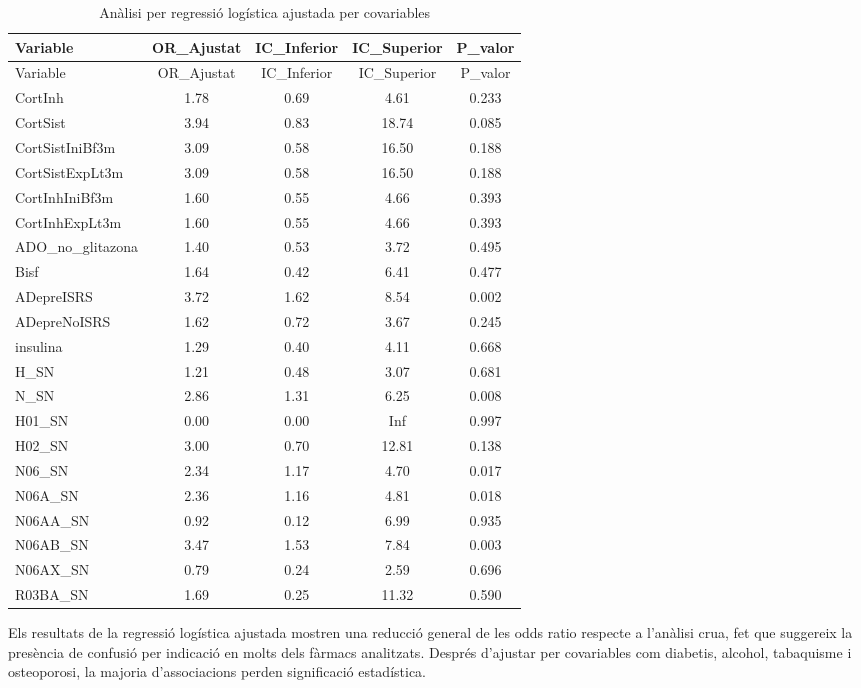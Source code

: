 \documentclass[
]{article}
\begin{document}
\begin{longtable}[]{@{}lcccc@{}}
\caption{\label{tab:logajust}Anàlisi per regressió logística ajustada
per covariables}\tabularnewline
\toprule\noalign{}
Variable & OR\_Ajustat & IC\_Inferior & IC\_Superior & P\_valor \\
\midrule\noalign{}
\endfirsthead
\toprule\noalign{}
Variable & OR\_Ajustat & IC\_Inferior & IC\_Superior & P\_valor \\
\midrule\noalign{}
\endhead
\bottomrule\noalign{}
\endlastfoot
CortInh & 1.78 & 0.69 & 4.61 & 0.233 \\
CortSist & 3.94 & 0.83 & 18.74 & 0.085 \\
CortSistIniBf3m & 3.09 & 0.58 & 16.50 & 0.188 \\
CortSistExpLt3m & 3.09 & 0.58 & 16.50 & 0.188 \\
CortInhIniBf3m & 1.60 & 0.55 & 4.66 & 0.393 \\
CortInhExpLt3m & 1.60 & 0.55 & 4.66 & 0.393 \\
ADO\_no\_glitazona & 1.40 & 0.53 & 3.72 & 0.495 \\
Bisf & 1.64 & 0.42 & 6.41 & 0.477 \\
ADepreISRS & 3.72 & 1.62 & 8.54 & 0.002 \\
ADepreNoISRS & 1.62 & 0.72 & 3.67 & 0.245 \\
insulina & 1.29 & 0.40 & 4.11 & 0.668 \\
H\_SN & 1.21 & 0.48 & 3.07 & 0.681 \\
N\_SN & 2.86 & 1.31 & 6.25 & 0.008 \\
H01\_SN & 0.00 & 0.00 & Inf & 0.997 \\
H02\_SN & 3.00 & 0.70 & 12.81 & 0.138 \\
N06\_SN & 2.34 & 1.17 & 4.70 & 0.017 \\
N06A\_SN & 2.36 & 1.16 & 4.81 & 0.018 \\
N06AA\_SN & 0.92 & 0.12 & 6.99 & 0.935 \\
N06AB\_SN & 3.47 & 1.53 & 7.84 & 0.003 \\
N06AX\_SN & 0.79 & 0.24 & 2.59 & 0.696 \\
R03BA\_SN & 1.69 & 0.25 & 11.32 & 0.590 \\
\end{longtable}

Els resultats de la regressió logística ajustada mostren una reducció
general de les odds ratio respecte a l'anàlisi crua, fet que suggereix
la presència de confusió per indicació en molts dels fàrmacs analitzats.
Després d'ajustar per covariables com diabetis, alcohol, tabaquisme i
osteoporosi, la majoria d'associacions perden significació estadística.
\end{document}
